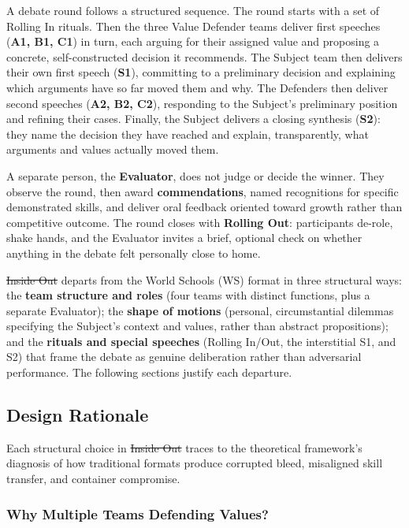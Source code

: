 \documentclass[12pt]{article}
\makeatletter
\providecommand{\DIFaddtex}[1]{{\protect\color[rgb]{0,0.5,0}\uwave{#1}}} %
\providecommand{\DIFdeltex}[1]{{\protect\color{red}\sout{#1}}} %
\providecommand{\DIFaddbegin}{} %
\providecommand{\DIFaddend}{} %
\providecommand{\DIFdelbegin}{} %
\providecommand{\DIFdelend}{} %
\providecommand{\DIFadd}[1]{\texorpdfstring{\DIFaddtex{#1}}{#1}} %
\providecommand{\DIFdel}[1]{\texorpdfstring{\DIFdeltex{#1}}{}} %
\providecommand{\DIFscaledelfig}{0.5}
\newlength{\DIFdelgraphicswidth} %
\newlength{\DIFdelgraphicsheight} %
\providecommand{\DIFaddincludegraphics}[2][]{{\color[rgb]{0,0.5,0}\fbox{\DIFOincludegraphics[#1]{#2}}}} %
\providecommand{\DIFdelincludegraphics}[2][]{%
\sbox{\DIFdelgraphicsbox}{\DIFOincludegraphics[#1]{#2}}%
\settoboxwidth{\DIFdelgraphicswidth}{\DIFdelgraphicsbox} %
\settoboxtotalheight{\DIFdelgraphicsheight}{\DIFdelgraphicsbox} %
\scalebox{\DIFscaledelfig}{%
\parbox[b]{\DIFdelgraphicswidth}{\usebox{\DIFdelgraphicsbox}\\[-\baselineskip] \rule{\DIFdelgraphicswidth}{0em}}\llap{\resizebox{\DIFdelgraphicswidth}{\DIFdelgraphicsheight}{%
\setlength{\unitlength}{\DIFdelgraphicswidth}%
\begin{picture}(1,1)%
\thicklines\linethickness{2pt} %
{\color[rgb]{1,0,0}\put(0,0){\framebox(1,1){}}}%
{\color[rgb]{1,0,0}\put(0,0){\line( 1,1){1}}}%
{\color[rgb]{1,0,0}\put(0,1){\line(1,-1){1}}}%
\end{picture}%
}\hspace*{3pt}}} %
} %
\DeclareRobustCommand{\DIFaddbegin}{\DIFOaddbegin \let\includegraphics\DIFaddincludegraphics} %
\DeclareRobustCommand{\DIFaddend}{\DIFOaddend \let\includegraphics\DIFOincludegraphics} %
\DeclareRobustCommand{\DIFdelbegin}{\DIFOdelbegin \let\includegraphics\DIFdelincludegraphics} %
\DeclareRobustCommand{\DIFdelend}{\DIFOaddend \let\includegraphics\DIFOincludegraphics} %
\let\sout@orig\sout %
\renewcommand{\sout}[1]{\ifmmode\text{\sout@orig{\ensuremath{#1}}}\else\sout@orig{#1}\fi} %
\makeatother
\begin{document}
A debate round follows a structured sequence. The round starts with a set of Rolling In rituals. Then the three Value Defender teams deliver first speeches (\textbf{A1, B1, C1}) in turn, each arguing for their assigned value and proposing a concrete, self-constructed decision it recommends. The Subject team then delivers their own first speech (\textbf{S1}), committing to a preliminary decision and explaining which arguments have so far moved them and why. The Defenders then deliver second speeches (\textbf{A2, B2, C2}), responding to the Subject's preliminary position and refining their cases. Finally, the Subject delivers a closing synthesis (\textbf{S2}): they name the decision they have reached and explain, transparently, what arguments and values actually moved them.

A separate person, the \textbf{Evaluator}, does not judge or decide the winner. They observe the round, then award \textbf{commendations}, named recognitions for specific demonstrated skills, and deliver oral feedback oriented toward growth rather than competitive outcome. The round closes with \textbf{Rolling Out}: participants de-role, shake hands, and the Evaluator invites a brief, optional check on whether anything in the debate felt personally close to home.

\DIFdelbegin \DIFdel{Inside Out }\DIFdelend \DIFaddbegin \emph{\DIFadd{Inside Out}} \DIFaddend departs from the World Schools (WS) format in three structural ways: the \textbf{team structure and roles} (four teams with distinct functions, plus a separate Evaluator); the \textbf{shape of motions} (personal, circumstantial dilemmas specifying the Subject's context and values, rather than abstract propositions); and the \textbf{rituals and special speeches} (Rolling In/Out, the interstitial S1, and S2) that frame the debate as genuine deliberation rather than adversarial performance. The following sections justify each departure.

\subsection{Design Rationale}

Each structural choice in \DIFdelbegin \DIFdel{Inside Out }\DIFdelend \DIFaddbegin \emph{\DIFadd{Inside Out}} \DIFaddend traces to the theoretical framework's diagnosis of how traditional formats produce corrupted bleed, misaligned skill transfer, and container compromise.

\subsubsection{Why Multiple Teams Defending Values?}
\end{document}
